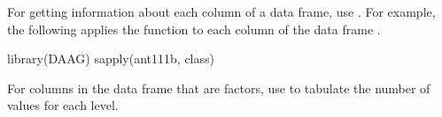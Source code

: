 \begin{enumerate}
For getting information about each column of a data frame, use
.  For example, the following applies the function
 to each column of the data frame .
\begin{Schunk}
\begin{Sinput}
library(DAAG)
sapply(ant111b, class)
\end{Sinput}
\end{Schunk}
For columns in the data frame  that are factors, use
 to tabulate the number of values for each level.
\end{enumerate}
%
